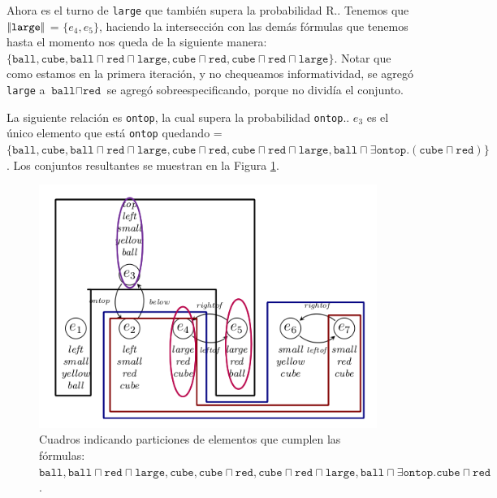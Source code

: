 Ahora es el turno de \texttt{large} que tambi\'en supera la probabilidad R.\randomuse. Tenemos que $|\!|\texttt{large}|\!|$ = $\{e_4, e_5\}$, haciendo la intersecci\'on con las dem\'as f\'ormulas que tenemos hasta el momento nos queda \RE de la siguiente manera:
 $\{\texttt{ball}, \texttt{cube}, \texttt{ball} \sqcap \texttt{red} \sqcap \texttt{large}, \texttt{cube} \sqcap \texttt{red} ,\texttt{cube} \sqcap \texttt{red} \sqcap \texttt{large} \}$. Notar que como estamos en la primera iteraci\'on, y no chequeamos informatividad, se agreg\'o \texttt{large} a $\texttt{ball} \sqcap \texttt{red}$ se agreg\'o sobreespecificando, porque no divid\'ia el conjunto. %


La siguiente relaci\'on es \texttt{ontop}, la cual supera la probabilidad \texttt{ontop}.\randomuse. $e_3$ es el \'unico elemento que est\'a \texttt{ontop} quedando \RE= $\{\texttt{ball}, \texttt{cube}, \texttt{ball} \sqcap \texttt{red} \sqcap \texttt{large}, \texttt{cube} \sqcap \texttt{red}, \texttt{cube} \sqcap \texttt{red} \sqcap \texttt{large}, \texttt{ball} \sqcap \exists \texttt{ontop}.(\texttt{cube} \sqcap \texttt{red})\}$. Los conjuntos resultantes se muestran en la Figura \ref{fig-modelo9c}.

\begin{figure}[H]
\begin{center}
\includegraphics[width=11cm]{images/im/ontop.png}
\caption{Cuadros indicando particiones de elementos que cumplen las f\'ormulas: $\texttt{ball}, \texttt{ball} \sqcap \texttt{red} \sqcap \texttt{large}, \texttt{cube},\texttt{cube} \sqcap \texttt{red}, \texttt{cube} \sqcap \texttt{red} \sqcap \texttt{large},\texttt{ball} \sqcap \exists \texttt{ontop}. \texttt{cube} \sqcap \texttt{red}$.}
\label{fig-modelo9c}
\end{center}
\end{figure}

